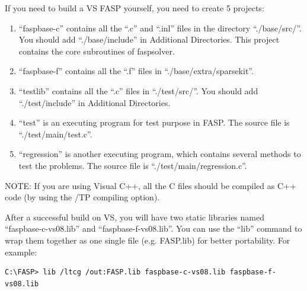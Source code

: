 \documentclass[11pt]{memoir}
\begin{document}
If you need to build a VS FASP yourself, you need to create 5 projects:
\begin{enumerate}
\item ``faspbase-c'' contains all the ``.c'' and ``.inl'' files in the
  directory ``./base/src/''. You should add ``./base/include'' in
  Additional Directories. This project contains the core subroutines
  of faspsolver.
\item ``faspbase-f'' contains all the ``.f'' files in
  ``./base/extra/sparsekit''.
\item ``testlib'' contains all the ``.c'' files in
  ``./test/src/''. You should add ``./test/include'' in Additional
  Directories.
\item ``test'' is an executing program for test purpose in FASP. The
  source file is ``./test/main/test.c''.
\item ``regression'' is another executing program, which contains
  several methods to test the problems. The source file is
  ``./test/main/regression.c''.
\end{enumerate}

\begin{snugshade}\noindent
  NOTE: If you are using Visual C++, all the C files should be
  compiled as C++ code (by using the /TP compiling option).
\end{snugshade}

After a successful build on VS, you will have two static libraries
named ``faspbase-c-vs08.lib'' and ``faspbase-f-vs08.lib''. You can use
the ``lib'' command to wrap them together as one single file
(e.g. FASP.lib) for better portability. For example:
%
\begin{lstlisting}[numbers=none]
C:\FASP> lib /ltcg /out:FASP.lib faspbase-c-vs08.lib faspbase-f-vs08.lib
\end{lstlisting}
%
\end{document}
